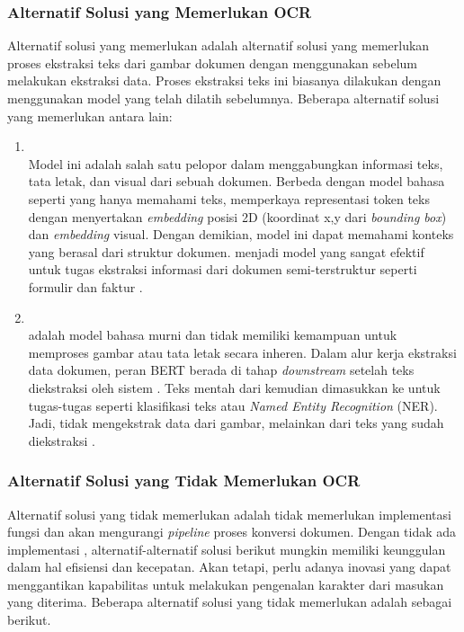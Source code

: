 \subsubsection{Alternatif Solusi yang Memerlukan OCR}
\label{subsubsec:alternatif-solusi-memerlukan-ocr}
Alternatif solusi yang memerlukan \ocr{} adalah alternatif solusi yang memerlukan proses ekstraksi teks dari gambar dokumen dengan menggunakan \ocr{} sebelum melakukan ekstraksi data. Proses ekstraksi teks ini biasanya dilakukan dengan menggunakan model \ocr{} yang telah dilatih sebelumnya. Beberapa alternatif solusi yang memerlukan \ocr{} antara lain:
\begin{enumerate}
    \item \layoutlm ~\\ Model ini adalah salah satu pelopor dalam menggabungkan informasi teks, tata letak, dan visual dari sebuah dokumen. Berbeda dengan model bahasa seperti \bert{} yang hanya memahami teks, \layoutlm{} memperkaya representasi token teks dengan menyertakan \textit{embedding} posisi 2D (koordinat x,y dari \emph{bounding box}) dan \textit{embedding} visual. Dengan demikian, model ini dapat memahami konteks yang berasal dari struktur dokumen. \layoutlm{} menjadi model yang sangat efektif untuk tugas ekstraksi informasi dari dokumen semi-terstruktur seperti formulir dan faktur \parencite{xu2020layoutlm}. 
    \item \bert{} ~\\
    \bert{} adalah model bahasa murni dan tidak memiliki kemampuan untuk memproses gambar atau tata letak secara inheren. Dalam alur kerja ekstraksi data dokumen, peran BERT berada di tahap \textit{downstream} setelah teks diekstraksi oleh sistem \ocr. Teks mentah dari \ocr{} kemudian dimasukkan ke \bert{} untuk tugas-tugas \nlp{} seperti klasifikasi teks atau \emph{Named Entity Recognition} (NER). Jadi, \bert{} tidak mengekstrak data dari gambar, melainkan dari teks yang sudah diekstraksi \parencite{koroteev2021bert}. 
\end{enumerate}

\subsubsection{Alternatif Solusi yang Tidak Memerlukan OCR}
\label{subsubsec:alternatif-solusi-tidak-memerlukan-ocr}
Alternatif solusi yang tidak memerlukan \ocr{} adalah tidak memerlukan implementasi fungsi \ocr{} dan akan mengurangi \emph{pipeline} proses konversi dokumen. Dengan tidak ada implementasi \ocr, alternatif-alternatif solusi berikut mungkin memiliki keunggulan dalam hal efisiensi dan kecepatan. Akan tetapi, perlu adanya inovasi yang dapat menggantikan  kapabilitas \ocr{} untuk melakukan pengenalan karakter dari masukan yang diterima. Beberapa alternatif solusi yang tidak memerlukan \ocr{} adalah sebagai berikut.

